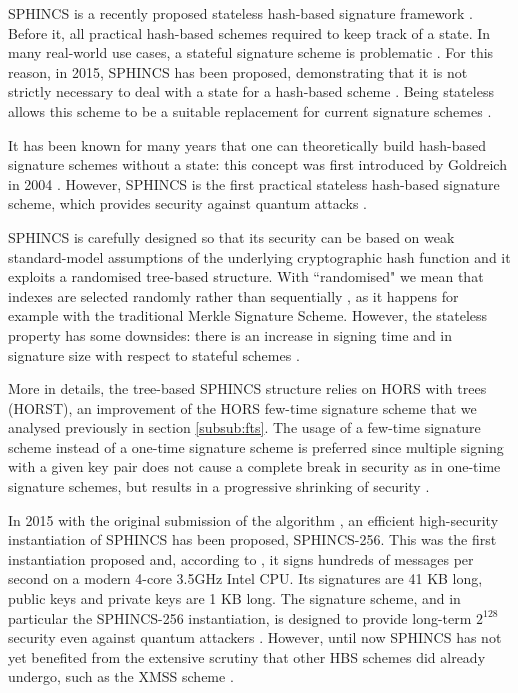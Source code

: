 \documentclass[a4paper,12pt]{article}
\begin{document}
SPHINCS is a recently proposed stateless hash-based signature framework \cite{1_sphincspaper}.
Before it, all practical hash-based schemes required to keep track of a state. In many real-world use cases, a stateful signature scheme is problematic \cite{8_ARM}.
For this reason, in 2015, SPHINCS has been proposed, demonstrating that it is not strictly necessary to deal with a state for a hash-based scheme \cite{8_ARM}. Being stateless allows this scheme to be a suitable replacement for current signature schemes \cite{1_sphincspaper}.

It has been known for many years that one can theoretically build hash-based signature schemes without a state: this concept was first introduced by Goldreich in 2004 \cite{50_Goldreich}. 
However, SPHINCS is the first practical stateless hash-based signature scheme, which provides security against quantum attacks \cite{1_sphincspaper}.

SPHINCS is carefully designed so that its security can be based on weak standard-model assumptions of the underlying cryptographic hash function \cite{1_sphincspaper} and it exploits a randomised tree-based structure. With ``randomised" we mean that indexes are selected randomly rather than sequentially \cite{9_postquantum_auth_openssl}, as it happens for example with the traditional Merkle Signature Scheme.
However, the stateless property has some downsides: there is an increase in signing time and in signature size with respect to stateful schemes \cite{8_ARM}. 

More in details, the tree-based SPHINCS structure relies on HORS with trees (HORST), an improvement of the HORS few-time signature scheme that we analysed previously in section \ref{subsub:fts}. The usage of a few-time signature scheme instead of a one-time signature scheme is preferred since multiple signing with a given key pair does not cause a complete break in security as in one-time signature schemes, but results in a progressive shrinking of security \cite{9_postquantum_auth_openssl}.

In 2015 with the original submission of the algorithm \cite{1_sphincspaper}, an efficient high-security instantiation of SPHINCS has been proposed, SPHINCS-256. 
This was the first instantiation proposed and, according to \cite{1_sphincspaper}, it signs hundreds of messages per second on a modern 4-core 3.5GHz Intel CPU. Its signatures are 41 KB long, public keys and private keys are 1 KB long. The signature scheme, and in particular the SPHINCS-256 instantiation, is designed to provide long-term $2^{128}$ security even against quantum attackers \cite{1_sphincspaper}.
However, until now SPHINCS has not yet benefited from the extensive scrutiny that other HBS schemes did already undergo, such as the XMSS scheme \cite{9_postquantum_auth_openssl}.
\end{document}
